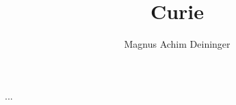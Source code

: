 \documentclass[a4paper,twoside,titlepage]{article}
\title{Curie}
\author{Magnus Achim Deininger}
\begin{document}
...
\end{document}
